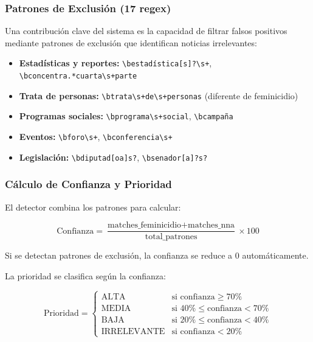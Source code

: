 \subsubsection{Patrones de Exclusión (17 regex)}
\label{subsubsec:patrones_exclusion}

Una contribución clave del sistema es la capacidad de filtrar falsos positivos mediante patrones de exclusión que identifican noticias irrelevantes:

\begin{itemize}
    \item \textbf{Estadísticas y reportes:} \texttt{\textbackslash bestadística[s]?\textbackslash s+}, \texttt{\textbackslash bconcentra.*cuarta\textbackslash s+parte}
    \item \textbf{Trata de personas:} \texttt{\textbackslash btrata\textbackslash s+de\textbackslash s+personas} (diferente de feminicidio)
    \item \textbf{Programas sociales:} \texttt{\textbackslash bprograma\textbackslash s+social}, \texttt{\textbackslash bcampaña}
    \item \textbf{Eventos:} \texttt{\textbackslash bforo\textbackslash s+}, \texttt{\textbackslash bconferencia\textbackslash s+}
    \item \textbf{Legislación:} \texttt{\textbackslash bdiputad[oa]s?}, \texttt{\textbackslash bsenador[a]?s?}
\end{itemize}

\subsubsection{Cálculo de Confianza y Prioridad}
\label{subsubsec:confianza_prioridad}

El detector combina los patrones para calcular:

\begin{equation}
\text{Confianza} = \frac{\text{matches\_feminicidio} + \text{matches\_nna}}{\text{total\_patrones}} \times 100
\end{equation}

Si se detectan patrones de exclusión, la confianza se reduce a 0 automáticamente.

La prioridad se clasifica según la confianza:

\begin{equation}
\text{Prioridad} = \begin{cases}
\text{ALTA} & \text{si confianza} \geq 70\% \\
\text{MEDIA} & \text{si } 40\% \leq \text{confianza} < 70\% \\
\text{BAJA} & \text{si } 20\% \leq \text{confianza} < 40\% \\
\text{IRRELEVANTE} & \text{si confianza} < 20\%
\end{cases}
\end{equation}

